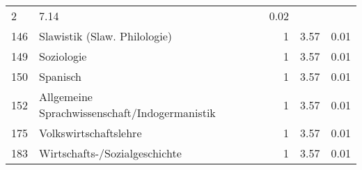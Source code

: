 \begin{longtable}{lXrrr}
       \num{2} &
       \num[round-mode=places,round-precision=2]{7.14} &
         \num[round-mode=places,round-precision=2]{0.02} \\

     146 &
     \multicolumn{1}{X}{ Slawistik (Slaw. Philologie)   } &


       \num{1} &
       \num[round-mode=places,round-precision=2]{3.57} &
         \num[round-mode=places,round-precision=2]{0.01} \\

     149 &
     \multicolumn{1}{X}{ Soziologie   } &


       \num{1} &
       \num[round-mode=places,round-precision=2]{3.57} &
         \num[round-mode=places,round-precision=2]{0.01} \\

     150 &
     \multicolumn{1}{X}{ Spanisch   } &


       \num{1} &
       \num[round-mode=places,round-precision=2]{3.57} &
         \num[round-mode=places,round-precision=2]{0.01} \\

     152 &
     \multicolumn{1}{X}{ Allgemeine Sprachwissenschaft/Indogermanistik   } &


       \num{1} &
       \num[round-mode=places,round-precision=2]{3.57} &
         \num[round-mode=places,round-precision=2]{0.01} \\

     175 &
     \multicolumn{1}{X}{ Volkswirtschaftslehre   } &


       \num{1} &
       \num[round-mode=places,round-precision=2]{3.57} &
         \num[round-mode=places,round-precision=2]{0.01} \\

     183 &
     \multicolumn{1}{X}{ Wirtschafts-/Sozialgeschichte   } &


       \num{1} &
       \num[round-mode=places,round-precision=2]{3.57} &
         \num[round-mode=places,round-precision=2]{0.01} \\


\end{longtable}
